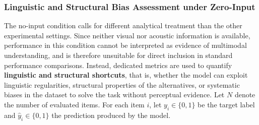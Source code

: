 \subsubsection*{Linguistic and Structural Bias Assessment under Zero-Input}
The no-input condition calls for different analytical treatment than the other experimental settings. Since neither visual nor acoustic information is available, performance in this condition cannot be interpreted as evidence of multimodal understanding, and is therefore unsuitable for direct inclusion in standard performance comparisons. Instead, dedicated metrics are used to quantify \textbf{linguistic and structural shortcuts}, that is, whether the model can exploit linguistic regularities, structural properties of the alternatives, or systematic biases in the dataset to solve the task without perceptual evidence.
Let \(N\) denote the number of evaluated items. For each item \(i\), let \(y_i \in \{0,1\}\) be the target label and \(\hat{y}_i \in \{0,1\}\) the prediction produced by the model.
